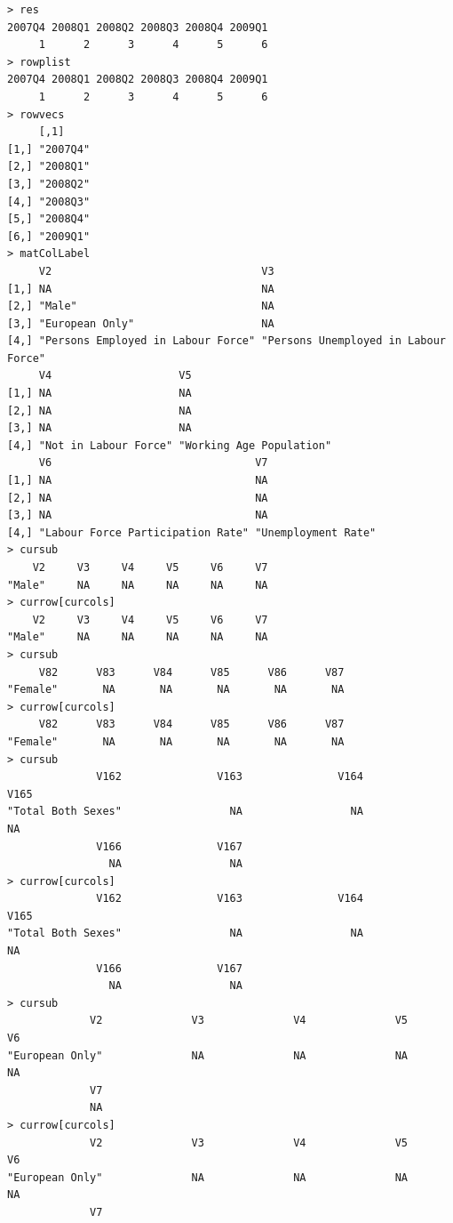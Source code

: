 \documentclass[a4paper]{article}
\begin{document}
\begin{verbatim}
> res 
2007Q4 2008Q1 2008Q2 2008Q3 2008Q4 2009Q1 
     1      2      3      4      5      6 
> rowplist 
2007Q4 2008Q1 2008Q2 2008Q3 2008Q4 2009Q1 
     1      2      3      4      5      6 
> rowvecs 
     [,1]    
[1,] "2007Q4"
[2,] "2008Q1"
[3,] "2008Q2"
[4,] "2008Q3"
[5,] "2008Q4"
[6,] "2009Q1"
> matColLabel 
     V2                                 V3                                  
[1,] NA                                 NA                                  
[2,] "Male"                             NA                                  
[3,] "European Only"                    NA                                  
[4,] "Persons Employed in Labour Force" "Persons Unemployed in Labour Force"
     V4                    V5                      
[1,] NA                    NA                      
[2,] NA                    NA                      
[3,] NA                    NA                      
[4,] "Not in Labour Force" "Working Age Population"
     V6                                V7                 
[1,] NA                                NA                 
[2,] NA                                NA                 
[3,] NA                                NA                 
[4,] "Labour Force Participation Rate" "Unemployment Rate"
> cursub 
    V2     V3     V4     V5     V6     V7 
"Male"     NA     NA     NA     NA     NA 
> currow[curcols] 
    V2     V3     V4     V5     V6     V7 
"Male"     NA     NA     NA     NA     NA 
> cursub 
     V82      V83      V84      V85      V86      V87 
"Female"       NA       NA       NA       NA       NA 
> currow[curcols] 
     V82      V83      V84      V85      V86      V87 
"Female"       NA       NA       NA       NA       NA 
> cursub 
              V162               V163               V164               V165 
"Total Both Sexes"                 NA                 NA                 NA 
              V166               V167 
                NA                 NA 
> currow[curcols] 
              V162               V163               V164               V165 
"Total Both Sexes"                 NA                 NA                 NA 
              V166               V167 
                NA                 NA 
> cursub 
             V2              V3              V4              V5              V6 
"European Only"              NA              NA              NA              NA 
             V7 
             NA 
> currow[curcols] 
             V2              V3              V4              V5              V6 
"European Only"              NA              NA              NA              NA 
             V7 

\end{verbatim}
\end{document}
